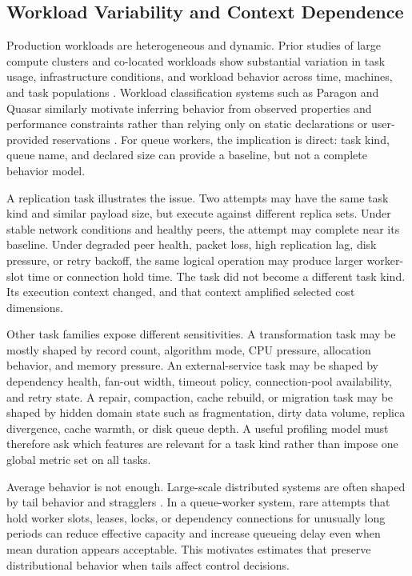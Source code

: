 \subsection{Workload Variability and Context Dependence}
\label{sec:background-workload-variability}

Production workloads are heterogeneous and dynamic. Prior studies of large
compute clusters and co-located workloads show substantial variation in task
usage, infrastructure conditions, and workload behavior across time, machines,
and task populations
\cite{zhang2011taskusage,reiss2012heterogeneity,cheng2018alibaba}. Workload
classification systems such as Paragon and Quasar similarly motivate inferring
behavior from observed properties and performance constraints rather than
relying only on static declarations or user-provided reservations
\cite{delimitrou2013paragon,delimitrou2014quasar}. For queue workers, the
implication is direct: task kind, queue name, and declared size can provide a
baseline, but not a complete behavior model.

A replication task illustrates the issue. Two attempts may have the same task
kind and similar payload size, but execute against different replica sets. Under
stable network conditions and healthy peers, the attempt may complete near its
baseline. Under degraded peer health, packet loss, high replication lag, disk
pressure, or retry backoff, the same logical operation may produce larger
worker-slot time or connection hold time. The task did not become a different
task kind. Its execution context changed, and that context amplified selected
cost dimensions.

Other task families expose different sensitivities. A transformation task may be
mostly shaped by record count, algorithm mode, CPU pressure, allocation behavior,
and memory pressure. An external-service task may be shaped by dependency
health, fan-out width, timeout policy, connection-pool availability, and retry
state. A repair, compaction, cache rebuild, or migration task may be shaped by
hidden domain state such as fragmentation, dirty data volume, replica divergence,
cache warmth, or disk queue depth. A useful profiling model must therefore ask
which features are relevant for a task kind rather than impose one global metric
set on all tasks.

Average behavior is not enough. Large-scale distributed systems are often shaped
by tail behavior and stragglers \cite{dean2013tail,dean2004mapreduce}. In a
queue-worker system, rare attempts that hold worker slots, leases, locks, or
dependency connections for unusually long periods can reduce effective capacity
and increase queueing delay even when mean duration appears acceptable. This
motivates estimates that preserve distributional behavior when tails affect
control decisions.


